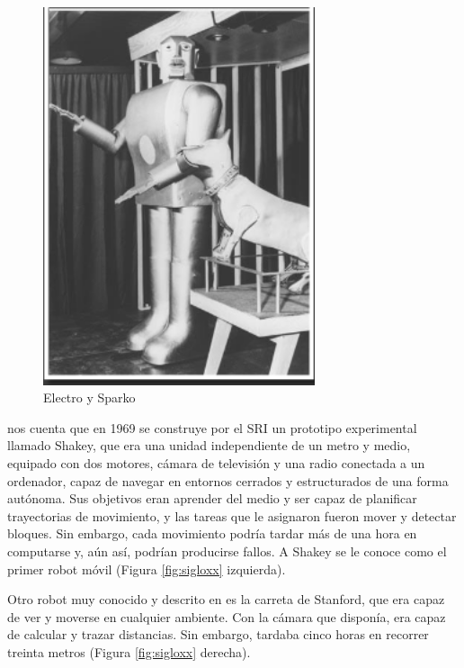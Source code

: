 \begin{figure} [h!]
	\begin{center}
		\includegraphics[width=8cm]{figs/electro-sparko.png}
	\end{center}
	\caption{Electro y Sparko}
	\label{fig:EyS}
\end{figure}


\cite{nilsson1984shakey} nos cuenta que en 1969 se construye por el \ac{SRI} un prototipo experimental llamado Shakey, que era una unidad independiente de un metro y medio, equipado con dos motores, cámara de televisión y una radio conectada a un ordenador, capaz de navegar en entornos cerrados y estructurados de una forma autónoma. Sus objetivos eran aprender del medio y ser capaz de planificar trayectorias de movimiento, y las tareas que le asignaron fueron mover y detectar bloques. Sin embargo, cada movimiento podría tardar más de una hora en computarse y, aún así, podrían producirse fallos. A Shakey se le conoce como el primer robot móvil (Figura \ref{fig:sigloxx} izquierda). 


Otro robot muy conocido  y descrito en \cite{earnest2012stanfordcart} es la carreta de Stanford, que era capaz de ver y moverse en cualquier ambiente. Con la cámara que disponía, era capaz de calcular y trazar distancias. Sin embargo, tardaba cinco horas en recorrer treinta metros (Figura \ref{fig:sigloxx} derecha). 


